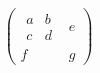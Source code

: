 \documentclass{article}
\begin{document}
\[
\begin{pmatrix}
{\begin{smallmatrix}a&b\\c&d\end{smallmatrix}} & e \\
f & g
\end{pmatrix}
\]
\end{document}
